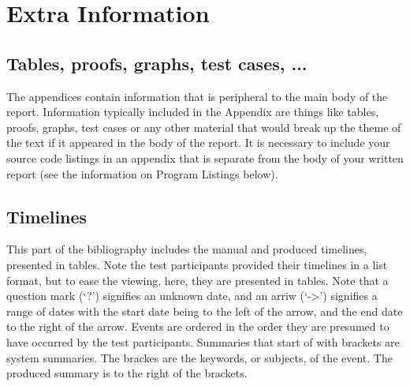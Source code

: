 \chapter{Extra Information}
\section{Tables, proofs, graphs, test cases, ...}
The appendices contain information that is peripheral to the main body of the report. Information typically included in the Appendix are things like tables, proofs, graphs, test cases or any other material that would break up the theme of the text if it appeared in the body of the report. It is necessary to include your source code listings in an appendix that is separate from the body of your written report (see the information on Program Listings below).

\section{Timelines}
\par This part of the bibliography includes the manual and produced timelines, presented in tables. Note the test participants provided their timelines in a list format, but to ease the viewing, here, they are presented in tables. Note that a question mark (`?') signifies an unknown date, and an arriw (`->') signifies a range of dates with the start date being to the left of the arrow, and the end date to the right of the arrow. Events are ordered in the order they are presumed to have occurred by the test participants. Summaries that start of with brackets are system summaries. The brackes are the keywords, or subjects, of the event. The produced summary is to the right of the brackets.
